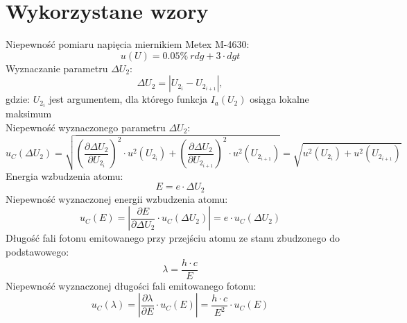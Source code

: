 \documentclass[12pt, a4paper, oneside]{article}
\begin{document}
\section{Wykorzystane wzory}
Niepewność pomiaru napięcia miernikiem Metex M-4630:
\begin{equation}
u(U)=0.05\%~rdg + 3\cdot dgt
\end{equation}
Wyznaczanie parametru $\Delta U_2$:
\begin{equation}
\Delta U_2=|U_{2_i} - U_{2_{i+1}}|,
\end{equation}
\indent gdzie: $U_{2_i}$ jest argumentem, dla którego funkcja $I_a(U_2)$ osiąga lokalne maksimum\\

\noindent Niepewność wyznaczonego parametru $\Delta U_2$:
\begin{equation}
u_C(\Delta U_2)=\sqrt{(\frac{\partial \Delta U_2}{\partial U_{2_i}})^2\cdot u^2(U_{2_{i}}) + (\frac{\partial \Delta U_2}{\partial U_{2_{i+1}}})^2\cdot u^2(U_{2_{i+1}})}=\sqrt{u^2(U_{2_{i}})+u^2(U_{2_{i+1}})}
\end{equation}
Energia wzbudzenia atomu:
\begin{equation}
E=e\cdot\Delta U_2
\end{equation}
Niepewność wyznaczonej energii wzbudzenia atomu:
\begin{equation}
u_C(E)=|\frac{\partial E}{\partial \Delta U_2}\cdot u_C(\Delta U_2)|=e \cdot u_C(\Delta U_2)
\end{equation}
Długość fali fotonu emitowanego przy przejściu atomu ze stanu zbudzonego do podstawowego:
\begin{equation}
\lambda = \frac{h\cdot c}{E}
\end{equation}
Niepewność wyznaczonej długości fali emitowanego fotonu:
\begin{equation}
u_C(\lambda)= |\frac{\partial \lambda}{\partial E}\cdot u_C(E)|=\frac{h\cdot c}{E^2}\cdot u_C(E)
\end{equation}
\end{document}
